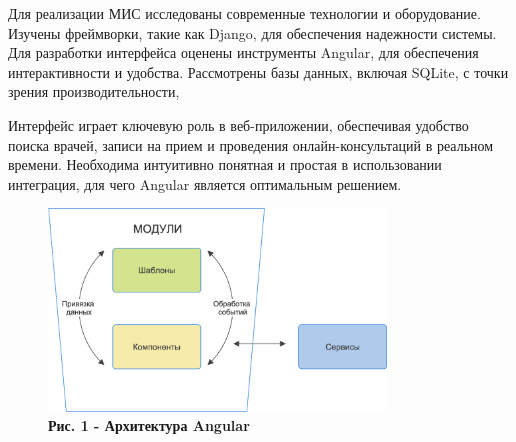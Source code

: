 \begin{multicols}{2}
Для реализации МИС исследованы современные технологии и оборудование.
Изучены фреймворки, такие как Django, для обеспечения надежности
системы. Для разработки интерфейса оценены инструменты Angular, для
обеспечения интерактивности и удобства. Рассмотрены базы данных, включая
SQLite, с точки зрения производительности,

Интерфейс играет ключевую роль в веб-приложении, обеспечивая удобство
поиска врачей, записи на прием и проведения онлайн-консультаций в
реальном времени. Необходима интуитивно понятная и простая в
использовании интеграция, для чего Angular является оптимальным
решением.
\end{multicols}

\begin{figure}[]
	\centering
	\includegraphics[width=0.8\textwidth]{assets/151}
	\caption*{\bfseries Рис. 1 - Архитектура Angular}
\end{figure}


